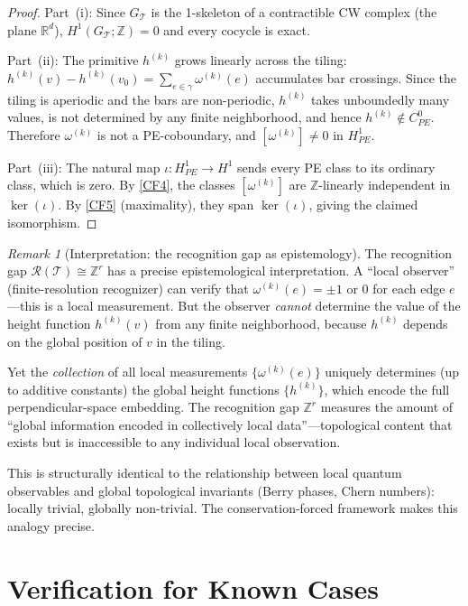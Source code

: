 \documentclass[12pt]{article}
\theoremstyle{definition}
\theoremstyle{remark}
\newtheorem{remark}[theorem]{Remark}
\newcommand{\RR}{\mathbb{R}}
\newcommand{\ZZ}{\mathbb{Z}}
\begin{document}
\begin{proof}
Part~(i): Since $G_{\mathcal{T}}$ is the 1-skeleton of a contractible CW complex (the plane $\RR^d$), $H^1(G_{\mathcal{T}}; \ZZ) = 0$ and every cocycle is exact.

Part~(ii): The primitive $h^{(k)}$ grows linearly across the tiling: $h^{(k)}(v) - h^{(k)}(v_0) = \sum_{e \in \gamma} \omega^{(k)}(e)$ accumulates bar crossings. Since the tiling is aperiodic and the bars are non-periodic, $h^{(k)}$ takes unboundedly many values, is not determined by any finite neighborhood, and hence $h^{(k)} \notin C^0_{PE}$. Therefore $\omega^{(k)}$ is not a PE-coboundary, and $[\omega^{(k)}] \neq 0$ in $H^1_{PE}$.

Part~(iii): The natural map $\iota: H^1_{PE} \to H^1$ sends every PE class to its ordinary class, which is zero. By \ref{CF4}, the classes $[\omega^{(k)}]$ are $\ZZ$-linearly independent in $\ker(\iota)$. By \ref{CF5} (maximality), they span $\ker(\iota)$, giving the claimed isomorphism.
\end{proof}

\begin{remark}[Interpretation: the recognition gap as epistemology]
\label{rem:recognition}
The recognition gap $\mathcal{R}(\mathcal{T}) \cong \ZZ^r$ has a precise epistemological interpretation. A ``local observer'' (finite-resolution recognizer) can verify that $\omega^{(k)}(e) = \pm 1$ or $0$ for each edge $e$---this is a local measurement. But the observer \emph{cannot} determine the value of the height function $h^{(k)}(v)$ from any finite neighborhood, because $h^{(k)}$ depends on the global position of $v$ in the tiling.

Yet the \emph{collection} of all local measurements $\{\omega^{(k)}(e)\}$ uniquely determines (up to additive constants) the global height functions $\{h^{(k)}\}$, which encode the full perpendicular-space embedding. The recognition gap $\ZZ^r$ measures the amount of ``global information encoded in collectively local data''---topological content that exists but is inaccessible to any individual local observation.

This is structurally identical to the relationship between local quantum observables and global topological invariants (Berry phases, Chern numbers): locally trivial, globally non-trivial. The conservation-forced framework makes this analogy precise.
\end{remark}


\section{Verification for Known Cases}
\label{sec:verification}
\end{document}
